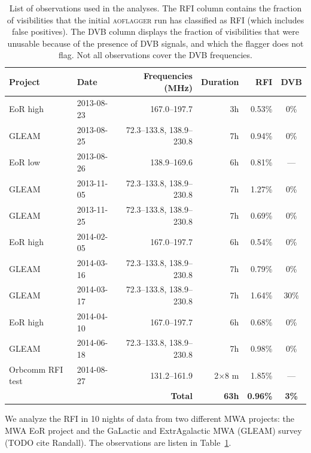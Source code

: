 \documentclass{pasa}
\begin{document}
\begin{table}
\caption{List of observations used in the analyses. The RFI column contains the fraction of visibilities that the initial \textsc{aoflagger} run has classified as RFI (which includes false positives). The DVB column displays the fraction of visibilities that were unusable because of the presence of DVB signals, and which the flagger does not flag. Not all observations cover the DVB frequencies. }\label{tbl:obs-list}
\begin{center}%
\begin{tabular}{|l|l|r|r|r|c|}
\hline
\textbf{Project} &\textbf{Date} & \textbf{Frequencies (MHz)} & \textbf{Duration} & RFI & DVB \\
\hline
EoR high& 2013-08-23 & 167.0--197.7              & 3h & 0.53\% & 0\% \\
GLEAM & 2013-08-25 & 72.3--133.8, 138.9--230.8 & 7h & 0.94\% & 0\% \\
EoR low& 2013-08-26 & 138.9--169.6              & 6h & 0.81\% & ---\\
GLEAM & 2013-11-05 & 72.3--133.8, 138.9--230.8 & 7h & 1.27\% & 0\% \\
GLEAM & 2013-11-25 & 72.3--133.8, 138.9--230.8 & 7h & 0.69\% & 0\% \\
EoR high& 2014-02-05 & 167.0--197.7              & 6h & 0.54\% & 0\%\\
GLEAM & 2014-03-16 & 72.3--133.8, 138.9--230.8 & 7h & 0.79\% & 0\% \\
GLEAM & 2014-03-17 & 72.3--133.8, 138.9--230.8 & 7h & 1.64\% & 30\% \\
EoR high& 2014-04-10 & 167.0--197.7              & 6h & 0.68\% & 0\%\\
GLEAM & 2014-06-18 & 72.3--133.8, 138.9--230.8 & 7h & 0.98\% & 0\% \\
Orbcomm RFI test&2014-08-27& 131.2--161.9     & 2$\times$8 m& 1.85\% & --- \\
\hline
\multicolumn{3}{|r|}{\textbf{Total}} & \textbf{63h} & \textbf{0.96\%} & \textbf{3\%}\\
\hline
\end{tabular}
\end{center}
\end{table}

We analyze the RFI in 10 nights of data from two different MWA projects: the MWA EoR project \citep{bowman-science-with-the-mwa-2013} and the GaLactic and ExtrAgalactic MWA (GLEAM) survey (TODO cite Randall). The observations are listen in Table~\ref{tbl:obs-list}.
\end{document}
